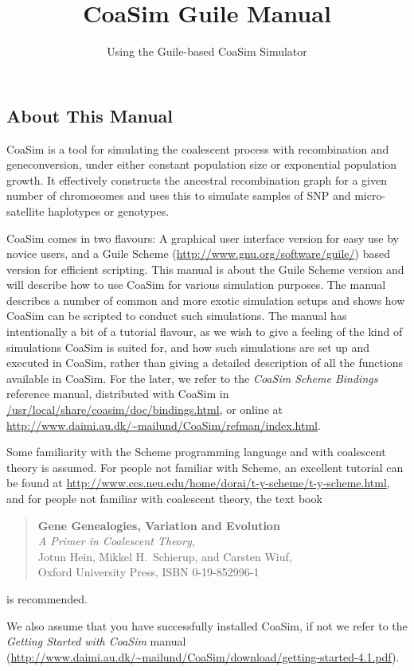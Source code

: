 \documentclass{manual}
\title{CoaSim Guile Manual}
\subtitle{Using the Guile-based CoaSim Simulator}
\begin{document}
\begin{empfile}


\section{About This Manual}
\label{sec:about-this-manual}

CoaSim is a tool for simulating the coalescent process with
recombination and geneconversion, under either constant population
size or exponential population growth.  It effectively constructs the
ancestral recombination graph for a given number of chromosomes and
uses this to simulate samples of SNP and micro-satellite haplotypes or
genotypes.

CoaSim comes in two flavours: A graphical user interface version for
easy use by novice users, and a Guile Scheme
(\url{http://www.gnu.org/software/guile/}) based version for efficient
scripting.  This manual is about the Guile Scheme version and will
describe how to use CoaSim for various simulation purposes.  The
manual describes a number of common and more exotic simulation setups
and shows how CoaSim can be scripted to conduct such simulations.  The
manual has intentionally a bit of a tutorial flavour, as we wish to
give a feeling of the kind of simulations CoaSim is suited for, and
how such simulations are set up and executed in CoaSim, rather than
giving a detailed description of all the functions available in
CoaSim.  For the later, we refer to the \emph{CoaSim Scheme Bindings}
reference manual, distributed with CoaSim in
\url{/usr/local/share/coasim/doc/bindings.html}, or online at
\url{http://www.daimi.au.dk/~mailund/CoaSim/refman/index.html}.

Some familiarity with the Scheme programming language and with
coalescent theory is assumed.  For people not familiar with Scheme, an
excellent tutorial can be found at
\url{http://www.ccs.neu.edu/home/dorai/t-y-scheme/t-y-scheme.html},
and for people not familiar with coalescent theory, the text book
\begin{quote}
  \textbf{Gene Genealogies, Variation and Evolution}\\
  \textit{A Primer in Coalescent Theory},\\
  Jotun Hein, Mikkel H.\ Schierup, and Carsten Wiuf,\\
  Oxford University Press, ISBN 0-19-852996-1  
\end{quote}
is recommended.

We also assume that you have successfully installed CoaSim, if not we
refer to the \emph{Getting Started with CoaSim} manual (\url{http://www.daimi.au.dk/~mailund/CoaSim/download/getting-started-4.1.pdf}).



\end{empfile}
\end{document}
